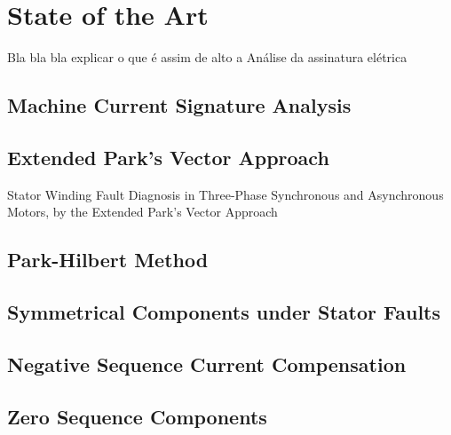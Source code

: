 \chapter{State of the Art}
\label{cha:state_of_the_art}

Bla bla bla explicar o que é assim de alto a Análise da assinatura elétrica


\section{Machine Current Signature Analysis} %
\label{sec:mcsa}

\section{Extended Park's Vector Approach} %
\label{sec:epva}

Stator Winding Fault Diagnosis in Three-Phase Synchronous and Asynchronous Motors, by the Extended Park’s Vector Approach


\section{Park-Hilbert Method} %
\label{sec:park_hilbert_method}

\section{Symmetrical Components under Stator Faults} %
\label{sec:symmetrical_components}

\section{Negative Sequence Current Compensation} %
\label{sec:negative_sequence_current_compensation}

\section{Zero Sequence Components} %
\label{sec:zero_sequence_components}


